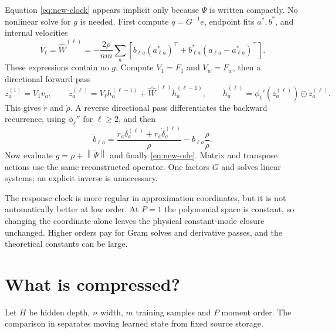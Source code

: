 \documentclass[11pt]{article}
\theoremstyle{definition}
\theoremstyle{remark}
\newcommand{\norm}[1]{\left\lVert #1\right\rVert}
\newcommand{\od}{\mathbin{\odot}}
\begin{document}
Equation \eqref{eq:new-clock} appears implicit only because $\dot\Psi$ is
written compactly.  No nonlinear solve for $g$ is needed.  First compute
$q=G^{-1}e$, endpoint fits $a^*,b^*$, and internal velocities
\begin{equation}
 V_\ell=\dot{\widehat W}^{(\ell)}=-\frac{2\rho}{nm}\sum_a
 \left[b_{\ell a}(a^*_{\ell a})^\top+
 b^*_{\ell a}(a_{\ell a}-a^*_{\ell a})^\top\right]. \label{eq:internal-velocity}
\end{equation}
These expressions contain no $g$.  Compute $V_1=F_1$ and $V_w=F_w$, then a
directional forward pass
\[
 \dot z_a^{(1)}=V_1v_a,\qquad
 \dot z_a^{(\ell)}=V_\ell h_a^{(\ell-1)}+
 \widehat W^{(\ell)}\dot h_a^{(\ell-1)},\qquad
 \dot h_a^{(\ell)}=\phi_\ell'(z_a^{(\ell)})\od\dot z_a^{(\ell)}.
\]
This gives $\dot r$ and $\dot\rho$.  A reverse directional pass differentiates
the backward recurrence, using $\phi_\ell''$ for $\ell\ge2$, and then
\[
 \dot b_{\ell a}=\frac{\dot r_a\delta_a^{(\ell)}+
 r_a\dot\delta_a^{(\ell)}}{\rho}-b_{\ell a}\frac{\dot\rho}{\rho}.
\]
Now evaluate $g=\rho+\norm{\dot\Psi}$ and finally
\eqref{eq:new-ode}.  Matrix and transpose actions use the same reconstructed
operator.  One factors $G$ and solves linear systems; an explicit inverse is
unnecessary.

The response clock is more regular in approximation coordinates, but it is not
automatically better at low order.  At $P=1$ the polynomial space is constant,
so changing the coordinate alone leaves the physical constant-mode closure
unchanged.  Higher orders pay for Gram solves and derivative passes, and the
theoretical constants can be large.

\section{What is compressed?}

Let $H$ be hidden depth, $n$ width, $m$ training samples and $P$ moment order.
The comparison in  separates moving learned state from
fixed source storage.
\end{document}
